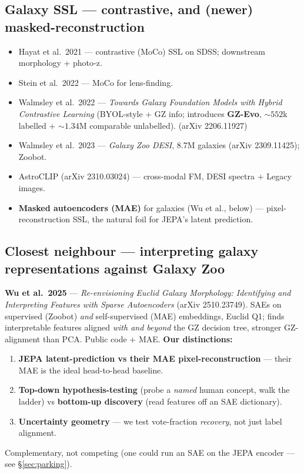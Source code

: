 \documentclass[11pt,a4paper]{article}
\begin{document}
\subsection{Galaxy SSL --- contrastive, and (newer) masked-reconstruction}
\begin{itemize}[leftmargin=1.4em,itemsep=1pt]
\item Hayat et al.\ 2021 --- contrastive (MoCo) SSL on SDSS; downstream morphology + photo-z.
\item Stein et al.\ 2022 --- MoCo for lens-finding.
\item Walmsley et al.\ 2022 --- \emph{Towards Galaxy Foundation Models with Hybrid Contrastive
Learning} (BYOL-style + GZ info; introduces \textbf{GZ-Evo}, ${\sim}552$k labelled +
${\sim}1.34$M comparable unlabelled). (arXiv 2206.11927)
\item Walmsley et al.\ 2023 --- \emph{Galaxy Zoo DESI}, 8.7M galaxies (arXiv 2309.11425);
Zoobot.
\item AstroCLIP (arXiv 2310.03024) --- cross-modal FM, DESI spectra + Legacy images.
\item \textbf{Masked autoencoders (MAE)} for galaxies (Wu et al., below) --- pixel-reconstruction
SSL, the natural foil for JEPA's latent prediction.
\end{itemize}

\subsection{Closest neighbour --- interpreting galaxy representations against Galaxy Zoo}
\textbf{Wu et al.\ 2025} --- \emph{Re-envisioning Euclid Galaxy Morphology: Identifying and
Interpreting Features with Sparse Autoencoders} (arXiv 2510.23749). SAEs on supervised (Zoobot)
\emph{and} self-supervised (MAE) embeddings, Euclid Q1; finds interpretable features aligned
\emph{with and beyond} the GZ decision tree, stronger GZ-alignment than PCA. Public code + MAE.
\textbf{Our distinctions:}
\begin{enumerate}[leftmargin=1.5em,itemsep=1pt]
\item \textbf{JEPA latent-prediction vs their MAE pixel-reconstruction} --- their MAE is the
ideal head-to-head baseline.
\item \textbf{Top-down hypothesis-testing} (probe a \emph{named} human concept, walk the ladder)
vs \textbf{bottom-up discovery} (read features off an SAE dictionary).
\item \textbf{Uncertainty geometry} --- we test vote-fraction \emph{recovery}, not just label
alignment.
\end{enumerate}
Complementary, not competing (one could run an SAE on the JEPA encoder --- see
\S\ref{sec:parking}).
\end{document}
